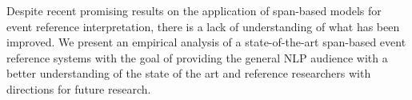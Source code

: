 Despite recent promising results on the application of span-based models for event reference interpretation, there is a lack of understanding of what has been improved. We present an empirical analysis of a state-of-the-art span-based event reference systems with the goal of providing the general NLP audience with a better understanding of the state of the art and reference researchers with directions for future research.
